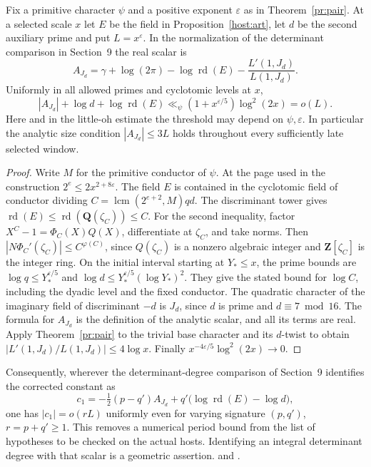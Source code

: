 \begin{proposition}\label{host:period}
Fix a primitive character \(\psi\)
and a positive exponent \(\varepsilon\) as in
Theorem~\ref{pr:pair}. At a selected scale \(x\) let \(E\) be the
field in Proposition~\ref{host:art}, let \(d\) be the second
auxiliary prime and put \(L=x^\varepsilon\).
In the normalization of the determinant comparison in Section~9 the
real scalar is
\[
 A_{J_d}=\gamma+\log(2\pi)-\log\operatorname{rd}(E)
                         -\frac{L'(1,J_d)}{L(1,J_d)} .
\]
Uniformly in all allowed primes and cyclotomic levels at \(x\),
\[
 |A_{J_d}|+\log d+\log\operatorname{rd}(E)
          \ll_\psi (1+x^{\varepsilon/5})\log^2(2x)=o(L).
\]
Here and in the little-oh estimate the threshold may depend on
\(\psi,\varepsilon\). In particular the analytic size condition
\(|A_{J_d}|\le3L\) holds throughout every sufficiently late selected
window.
\end{proposition}
\begin{proof}
Write \(M\) for the primitive conductor of \(\psi\).
At the page used in the construction \(2^e\le2x^{2+8\varepsilon}\).
The field \(E\) is contained in the cyclotomic field of conductor
dividing \(C=\operatorname{lcm}(2^{e+2},M)qd\).
The discriminant tower gives \(\operatorname{rd}(E)\le
\operatorname{rd}(\mathbf Q(\zeta_C))\le C\). For the second
inequality, factor \(X^C-1=\Phi_C(X)Q(X)\), differentiate at
\(\zeta_C\), and take norms. Then
\(|N\Phi_C'(\zeta_C)|\le C^{\varphi(C)}\), since \(Q(\zeta_C)\)
is a nonzero algebraic integer and \(\mathbf Z[\zeta_C]\) is the
integer ring. On the initial interval starting at \(Y_*\le x\),
the prime bounds are
\(\log q\le Y_*^{\varepsilon/5}\) and
\(\log d\le Y_*^{\varepsilon/5}(\log Y_*)^2\).
They give the stated bound for \(\log C\), including the dyadic
level and the fixed conductor. The quadratic character of the
imaginary field of discriminant \(-d\) is \(J_d\), since \(d\)
is prime and \(d\equiv7\bmod16\). The formula for \(A_{J_d}\)
is the definition of the analytic scalar, and all its terms are
real. Apply Theorem~\ref{pr:pair} to the trivial base character
and its \(d\)-twist to obtain
\(|L'(1,J_d)/L(1,J_d)|\le4\log x\). Finally
\(x^{-4\varepsilon/5}\log^2(2x)\to0\).
\end{proof}
Consequently, wherever the determinant-degree comparison of
Section~9 identifies the corrected constant as
\[
 c_1=-\tfrac12(p-q')A_{J_d}
                +q'\big(\log\operatorname{rd}(E)-\log d\big),
\]
one has \(|c_1|=o(rL)\) uniformly even for varying signature
\((p,q')\), \(r=p+q'\ge1\). This removes a numerical period bound
from the list of hypotheses to be checked on the actual hosts.
Identifying an integral determinant degree with that scalar is a
geometric assertion.
 and
.
